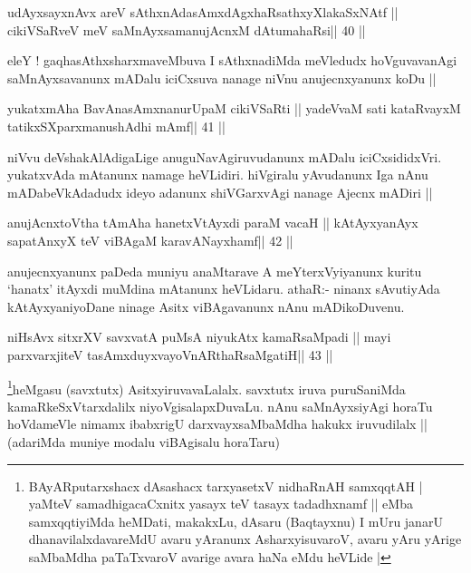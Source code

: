 \begin{shl}
udAyxsayxnAvx areV sAthxnAdasAmxdAgxhaRsathxyXlakaSxNAtf ||
cikiVSaRveV meV saMnAyxsamanujAcnxM dAtumahaRsi\hfill || 40 ||
\end{shl}

\begin{artha}
eleY ! gaqhasAthxsharxmaveMbuva I sAthxnadiMda meVledudx hoVguvavanAgi
saMnAyxsavanunx mADalu iciCxsuva nanage niVnu anujecnxyanunx koDu ||
\end{artha}

\begin{shl}
yukatxmAha BavAnasAmxnanurUpaM cikiVSaRti ||
yadeVvaM sati kataRvayxM tatikxSXparxmanushAdhi mAmf\hfill || 41 ||
\end{shl}

\begin{artha}
niVvu deVshakAlAdigaLige anuguNavAgiruvudanunx mADalu
iciCxsididxVri. yukatxvAda mAtanunx namage heVLidiri.
hiVgiralu yAvudanunx Iga nAnu mADabeVkAdadudx ideyo adanunx
shiVGarxvAgi nanage Ajecnx mADiri ||
\end{artha}


\begin{shl}
anujAcnxtoV\s tha tAmAha hanetxVtAyxdi paraM vacaH ||
kAtAyxyanAyx sapatAnxyX teV viBAgaM karavANayxhamf\hfill || 42 ||
\end{shl}

\begin{artha}
anujecnxyanunx paDeda muniyu anaMtarave A meYterxVyiyanunx kuritu
`hanatx' itAyxdi muMdina mAtanunx heVLidaru. athaR:- ninanx sAvutiyAda
kAtAyxyaniyoDane ninage Asitx viBAgavanunx nAnu mADikoDuvenu.
\end{artha}


\begin{shl}
niHsAvx sitxrXV savxvatA puMsA niyukAtx kamaRsaMpadi ||
mayi parxvarxjiteV tasAmxduyxvayoVnARthaRsaMgatiH\hfill || 43 ||
\end{shl}

\begin{artha}
\footnote[1]{BAyARputarxshacx dAsashacx tarxyasetxV nidhaRnAH
  samxqqtAH | yaMteV samadhigacaCxnitx yasayx teV tasayx tadadhxnamf || eMba
  samxqqtiyiMda heMDati, makakxLu, dAsaru (Baqtayxnu) I mUru janarU
  dhanavilalxdavareMdU avaru yAranunx AsharxyisuvaroV, avaru yAru
  yArige saMbaMdha paTaTxvaroV avarige avara haNa eMdu heVLide |}heMgasu 
  (savxtutx) AsitxyiruvavaLalalx. savxtutx iruva
puruSaniMda kamaRkeSxVtarxdalilx niyoVgisalapxDuvaLu. nAnu
saMnAyxsiyAgi horaTu hoVdameVle nimamx ibabxrigU darxvayxsaMbaMdha
hakukx iruvudilalx || (adariMda muniye modalu viBAgisalu horaTaru)
\end{artha}

